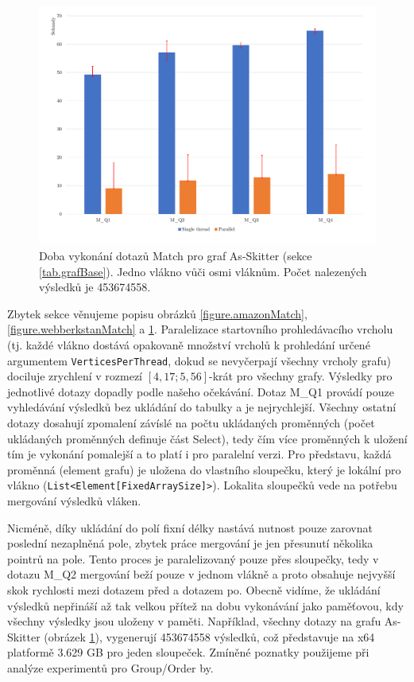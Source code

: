 \begin{figure}[!htp]
\includegraphics[width=\linewidth]{../img/skitterMatch.pdf}\centering
\caption{Doba vykonání dotazů Match pro graf As-Skitter (sekce \ref{tab.grafBase}). Jedno vlákno vůči osmi vláknům. Počet nalezených výsledků je 453674558.}
\label{figure.skitterMatch}
\end{figure}

\clearpage

Zbytek sekce věnujeme popisu obrázků \ref{figure.amazonMatch}, \ref{figure.webberkstanMatch} a \ref{figure.skitterMatch}. 
Paralelizace startovního prohledávacího vrcholu (tj. každé vlákno dostává opakovaně množství vrcholů k prohledání určené argumentem \verb+VerticesPerThread+, dokud se nevyčerpají všechny vrcholy grafu) dociluje zrychlení v rozmezí $[4,17; 5,56]$-krát pro všechny grafy.
Výsledky pro jednotlivé dotazy dopadly podle našeho očekávání. Dotaz M\_Q1 provádí pouze vyhledávání výsledků bez ukládání do tabulky a je nejrychlejší. 
Všechny ostatní dotazy dosahují zpomalení závíslé na počtu ukládaných proměnných (počet ukládaných proměnných definuje část Select), tedy čím více proměnných k uložení tím je vykonání pomalejší a to platí i pro paralelní verzi. 
Pro představu, každá proměnná (element grafu) je uložena do vlastního sloupečku, který je lokální pro vlákno (\verb+List<Element[FixedArraySize]>+). Lokalita sloupečků vede na potřebu mergování výsledků vláken. 

Nicméně, díky ukládání do polí fixní délky nastává nutnost pouze zarovnat poslední nezaplněná pole, zbytek práce mergování je jen přesunutí několika pointrů na pole. 
Tento proces je paralelizovaný pouze přes sloupečky, tedy v dotazu M\_Q2 mergování beží pouze v jednom vlákně a proto obsahuje nejvyšší skok rychlosti mezi dotazem před a dotazem po. 
Obecně vidíme, že ukládání výsledků nepřináší až tak velkou přítež na dobu vykonávání jako paměťovou, kdy všechny výsledky jsou uloženy v paměti. 
Například, všechny dotazy na grafu As-Skitter (obrázek \ref{figure.skitterMatch}), vygenerují 453674558 výsledků, což představuje na x64 platformě 3.629 GB pro jeden sloupeček.
Zmíněné poznatky použijeme při analýze experimentů pro Group/Order by.

